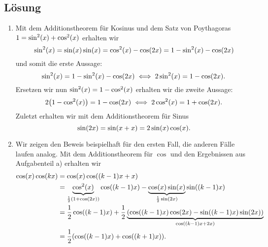 \documentclass{exercise}
\begin{document}
    \subsection*{Lösung}
    \begin{enumerate}
        \item Mit dem Additionstheorem für Kosinus und dem Satz von Poythagoras \(1 = \sin^2\parentheses*{x} + \cos^2\parentheses*{x}\) erhalten wir
        \[
            \sin^2\parentheses*{x} = \sin\parentheses*{x}\sin\parentheses*{x} = \cos^2\parentheses*{x} - \cos\parentheses*{2x} = 1 - \sin^2\parentheses*{x} - \cos\parentheses*{2x}
        \] 
        und somit die erste Aussage:
        \[
            \sin^2\parentheses*{x} = 1 - \sin^2\parentheses*{x} - \cos\parentheses*{2x} \iff 2\sin^2\parentheses*{x} = 1 - \cos\parentheses*{2x}.
        \]
        Ersetzen wir nun \(\sin^2\parentheses*{x} = 1 - \cos^2\parentheses*{x}\) erhalten wir die zweite Aussage:
        \[
            2\parentheses*{1 - \cos^2\parentheses*{x}} = 1 - \cos\parentheses*{2x} \iff 2\cos^2\parentheses*{x} = 1 + \cos\parentheses*{2x}.
        \]
        Zuletzt erhalten wir mit dem Additionstheorem für Sinus
        \[
            \sin\parentheses*{2x} = \sin\parentheses*{x + x} = 2\sin\parentheses*{x}\cos\parentheses*{x}.
        \]
        \item Wir zeigen den Beweis beispielhaft für den ersten Fall, die anderen Fälle laufen analog.
        Mit dem Additionstheorem für \(\cos\) und den Ergebnissen aus Aufgabenteil a) erhalten wir
        \begin{align*}
            \cos\parentheses*{x}\cos\parentheses*{kx} &= \cos\parentheses*{x}\cos\parentheses*{\parentheses*{k - 1}x + x}\\
            &= \underbrace{\cos^2\parentheses*{x}}_{\frac{1}{2}\parentheses*{1 + \cos\parentheses*{2x}}}\cos\parentheses*{\parentheses*{k - 1}x} - \underbrace{\cos\parentheses*{x}\sin\parentheses*{x}}_{\frac{1}{2}\sin\parentheses*{2x}}\sin\parentheses*{\parentheses*{k - 1}x}\\
            &= \frac{1}{2}\cos\parentheses*{\parentheses*{k - 1}x} + \frac{1}{2}\underbrace{\parentheses*{\cos\parentheses*{\parentheses*{k - 1}x}\cos\parentheses*{2x} - \sin\parentheses*{\parentheses*{k - 1}x}\sin\parentheses*{2x}}}_{\cos\parentheses*{\parentheses*{k - 1}x + 2x}}\\
            &= \frac{1}{2}\parentheses*{\cos\parentheses*{\parentheses*{k - 1}x} + \cos\parentheses*{\parentheses*{k + 1}x}}.
        \end{align*}

\end{enumerate}
\end{document}
